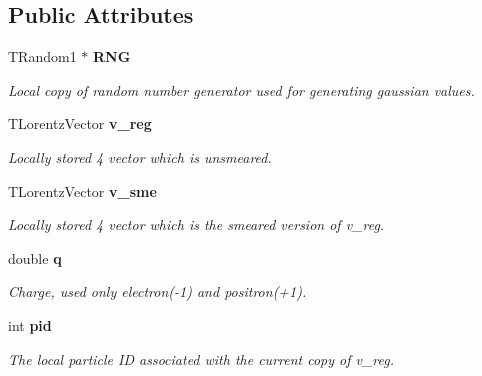 \subsection*{Public Attributes}
\begin{CompactItemize}
\item 
TRandom1 $\ast$ \bf{RNG}
\begin{CompactList}\small\item\em Local copy of random number generator used for generating gaussian values. \item\end{CompactList}\item 
TLorentz\-Vector \bf{v\_\-reg}
\begin{CompactList}\small\item\em Locally stored 4 vector which is unsmeared. \item\end{CompactList}\item 
TLorentz\-Vector \bf{v\_\-sme}
\begin{CompactList}\small\item\em Locally stored 4 vector which is the smeared version of v\_\-reg. \item\end{CompactList}\item 
double \bf{q}
\begin{CompactList}\small\item\em Charge, used only electron(-1) and positron(+1). \item\end{CompactList}\item 
int \bf{pid}
\begin{CompactList}\small\item\em The local particle ID associated with the current copy of v\_\-reg. \item\end{CompactList}\end{CompactItemize}
